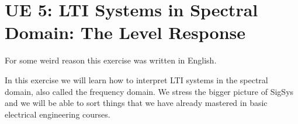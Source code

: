 
% 

\newpage
\section{UE 5: LTI Systems in Spectral Domain: The Level Response}
\label{sec:ue5_levelresponse}
For some weird reason this exercise was written in English.

\noindent In this exercise we will learn how to interpret LTI systems in the spectral
domain, also called the frequency domain. We stress the bigger
picture of SigSys and we will be able to sort things that we have already mastered
in basic electrical engineering courses.

